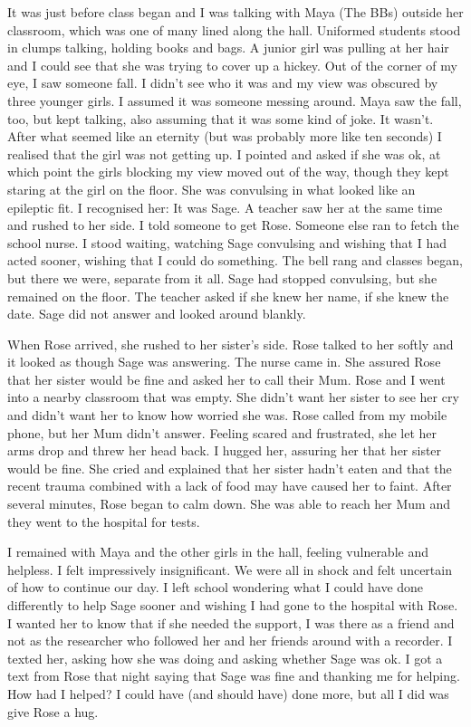 It was just before class began and I was talking with Maya (The BBs) outside her classroom, which was one of many lined along the hall. Uniformed students stood in clumps talking, holding books and bags. A junior girl was pulling at her hair and I could see that she was trying to cover up a hickey. Out of the corner of my eye, I saw someone fall. I didn't see who it was and my view was obscured by three younger girls. I assumed it was someone messing around. Maya saw the fall, too, but kept talking, also assuming that it was some kind of joke. It wasn't. After what seemed like an eternity (but was probably more like ten seconds) I realised that the girl was not getting up. I pointed and asked if she was ok, at which point the girls blocking my view moved out of the way, though they kept staring at the girl on the floor. She was convulsing in what looked like an epileptic fit. I recognised her: It was Sage. A teacher saw her at the same time and rushed to her side. I told someone to get Rose. Someone else ran to fetch the school nurse. I stood waiting, watching Sage convulsing and wishing that I had acted sooner, wishing that I could do something. The bell rang and classes began, but there we were, separate from it all. Sage had stopped convulsing, but she remained on the floor. The teacher asked if she knew her name, if she knew the date. Sage did not answer and looked around blankly. 

\largerpage
When Rose arrived, she rushed to her sister's side. Rose talked to her softly and it looked as though Sage was answering. The nurse came in. She assured Rose that her sister would be fine and asked her to call their Mum. Rose and I went into a nearby classroom that was empty. She didn't want her sister to see her cry and didn't want her to know how worried she was. Rose called from my mobile phone, but her Mum didn't answer. Feeling scared and frustrated, she let her arms drop and threw her head back. I hugged her, assuring her that her sister would be fine. She cried and explained that her sister hadn't eaten and that the recent trauma combined with a lack of food may have caused her to faint. After several minutes, Rose began to calm down. She was able to reach her Mum and they went to the hospital for tests. 

I remained with Maya and the other girls in the hall, feeling vulnerable and helpless. I felt impressively insignificant. We were all in shock and felt uncertain of how to continue our day. I left school wondering what I could have done differently to help Sage sooner and wishing I had gone to the hospital with Rose. I wanted her to know that if she needed the support, I was there as a friend and not as the researcher who followed her and her friends around with a recorder. I texted her, asking how she was doing and asking whether Sage was ok. I got a text from Rose that night saying that Sage was fine and thanking me for helping. How had I helped?  I could have (and should have) done more, but all I did was give Rose a hug. 

